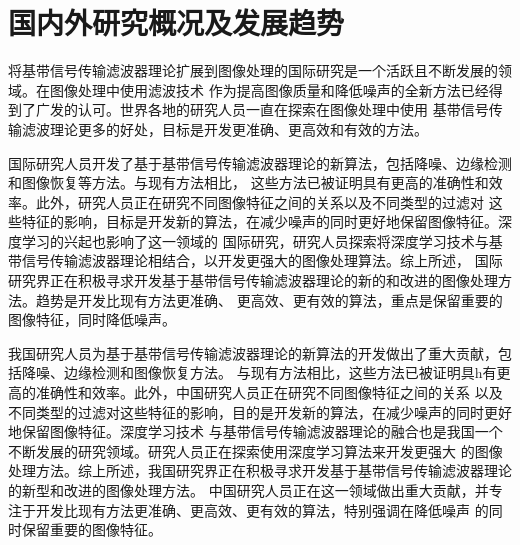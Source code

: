 %
%
%
%

\section{国内外研究概况及发展趋势}

将基带信号传输滤波器理论扩展到图像处理的国际研究是一个活跃且不断发展的领域。在图像处理中使用滤波技术
作为提高图像质量和降低噪声的全新方法已经得到了广发的认可。世界各地的研究人员一直在探索在图像处理中使用
基带信号传输滤波理论更多的好处，目标是开发更准确、更高效和有效的方法。

国际研究人员开发了基于基带信号传输滤波器理论的新算法，包括降噪、边缘检测和图像恢复等方法。与现有方法相比，
这些方法已被证明具有更高的准确性和效率。此外，研究人员正在研究不同图像特征之间的关系以及不同类型的过滤对
这些特征的影响，目标是开发新的算法，在减少噪声的同时更好地保留图像特征。深度学习的兴起也影响了这一领域的
国际研究，研究人员探索将深度学习技术与基带信号传输滤波器理论相结合，以开发更强大的图像处理算法。综上所述，
国际研究界正在积极寻求开发基于基带信号传输滤波器理论的新的和改进的图像处理方法。趋势是开发比现有方法更准确、
更高效、更有效的算法，重点是保留重要的图像特征，同时降低噪声。

我国研究人员为基于基带信号传输滤波器理论的新算法的开发做出了重大贡献，包括降噪、边缘检测和图像恢复方法。
与现有方法相比，这些方法已被证明具h有更高的准确性和效率。此外，中国研究人员正在研究不同图像特征之间的关系
以及不同类型的过滤对这些特征的影响，目的是开发新的算法，在减少噪声的同时更好地保留图像特征。深度学习技术
与基带信号传输滤波器理论的融合也是我国一个不断发展的研究领域。研究人员正在探索使用深度学习算法来开发更强大
的图像处理方法。综上所述，我国研究界正在积极寻求开发基于基带信号传输滤波器理论的新型和改进的图像处理方法。
中国研究人员正在这一领域做出重大贡献，并专注于开发比现有方法更准确、更高效、更有效的算法，特别强调在降低噪声
的同时保留重要的图像特征。

